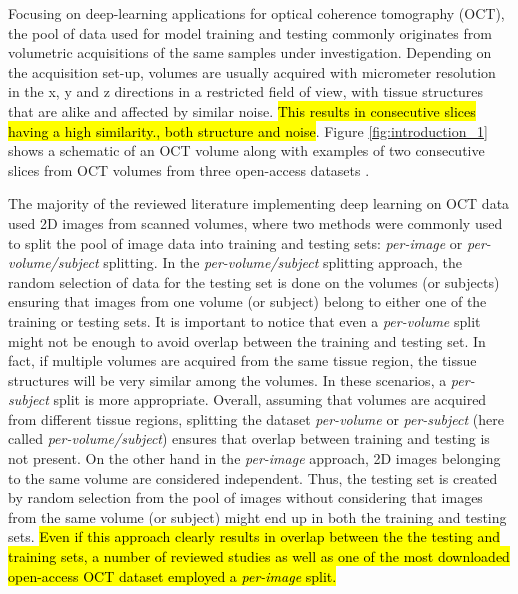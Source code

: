 \documentclass[fleqn,10pt]{wlscirep}
\begin{document}
Focusing on deep-learning applications for optical coherence tomography (OCT), the pool of data used for model training and testing commonly originates from volumetric acquisitions of the same samples under investigation. Depending on the acquisition set-up, volumes are usually acquired with micrometer resolution in the x, y and z directions in a restricted field of view, with tissue structures that are alike and affected by similar noise. \hl{This results in consecutive slices having a high similarity., both structure and noise}. Figure \ref{fig:introduction_1} shows a schematic of an OCT volume along with examples of two consecutive slices from OCT volumes from three open-access datasets \cite{butola2019volumetric, kermany2018large, srinivasan2014fully}.

The majority of the reviewed literature implementing deep learning on OCT data used 2D images from scanned volumes, where two methods were commonly used to split the pool of image data into training and testing sets: \textit{per-image} or \textit{per-volume/subject} splitting. 
In the \textit{per-volume/subject} splitting approach,  the random selection of data for the testing set is done on the volumes (or subjects) ensuring that images from one volume (or subject) belong to either one of the training or testing sets. It is important to notice that even a \textit{per-volume} split might not be enough to avoid overlap between the training and testing set. In fact, if multiple volumes are acquired from the same tissue region, the tissue structures will be very similar among the volumes. In these scenarios, a \textit{per-subject} split is more appropriate. Overall, assuming that volumes are acquired from different tissue regions, splitting the dataset \textit{per-volume} or \textit{per-subject} (here called \textit{per-volume/subject}) ensures that overlap between training and testing is not present.
On the other hand in the \textit{per-image} approach, 2D images belonging to the same volume are considered independent. Thus, the testing set is created by random selection from the pool of images without considering that images from the same volume (or subject) might end up in both the training and testing sets.  \hl{Even if this approach clearly results in overlap between the the testing and training sets,  a number of reviewed studies as well as one of the most downloaded open-access OCT dataset employed a \textit{per-image} split.} 
\end{document}
